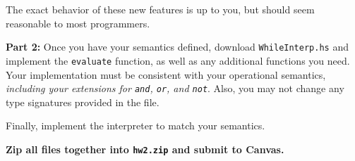 \documentclass{article}
\begin{document}
The exact behavior of these new features is up to you,
but should seem reasonable to most programmers.

\bigskip
\noindent
{\bf Part 2:}
Once you have your semantics defined,
download {\tt WhileInterp.hs} and implement the {\tt evaluate} function,
as well as any additional functions you need.
Your implementation must be consistent with your operational semantics,
{\it including your extensions for {\tt and}, {\tt or}, and {\tt not}}.
Also, you may not change any type signatures provided in the file.

Finally, implement the interpreter to match your semantics.

\bigskip
\noindent
{\bf Zip all files together into {\tt hw2.zip} and submit to Canvas.}
\end{document}
